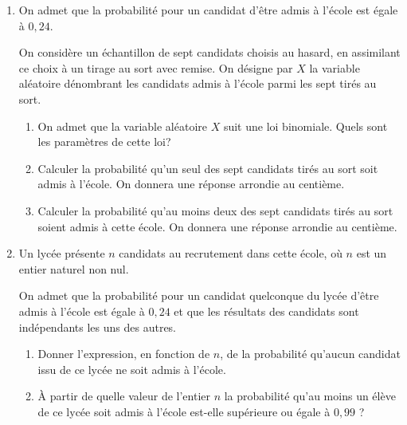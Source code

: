 \begin{enumerate}
\item On admet que la probabilité pour un candidat d'être admis à l'école est égale à $0,24$.

On considère un échantillon de sept candidats choisis au hasard, en assimilant ce choix à un tirage au sort avec remise. On désigne par $X$ la variable aléatoire dénombrant les candidats admis à l'école parmi les sept tirés au sort.
	\begin{enumerate}
		\item On admet que la variable aléatoire $X$ suit une loi binomiale. Quels sont les paramètres de cette loi?
		\item Calculer la probabilité qu'un seul des sept candidats tirés au sort soit admis à l'école. On donnera une réponse arrondie au centième.
		\item Calculer la probabilité qu'au moins deux des sept candidats tirés au sort soient admis à cette école. On donnera une réponse arrondie au centième.
	\end{enumerate}
\item  Un lycée présente $n$ candidats au recrutement dans cette école, où $n$ est un entier naturel non nul.

On admet que la probabilité pour un candidat quelconque du lycée d'être admis à l'école est égale à $0,24$ et que les résultats des candidats sont indépendants les uns des autres.
	\begin{enumerate}
		\item Donner l'expression, en fonction de $n$, de la probabilité qu'aucun candidat issu de ce lycée ne soit admis à l'école.
		\item À partir de quelle valeur de l'entier $n$ la probabilité qu'au moins un élève de ce lycée soit admis à l'école est-elle supérieure ou égale à $0,99$ ?
	\end{enumerate}
\end{enumerate}

\bigskip

